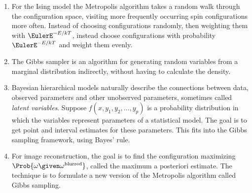 \documentclass[12pt]{article}
\begin{document}
\begin{enumerate}
    \item
        For the Ising model the Metropolis algorithm takes a random walk
        through the configuration space, visiting more frequently
        occurring spin configurations more often.  Instead of choosing
        configurations randomly, then weighting them with \( \EulerE^{-E/kT}
        \), instead choose configurations with probability \( \EulerE^{-E/kT}
        \) and weight them evenly.
    \item
        The Gibbs sampler is an algorithm for generating random
        variables from a marginal distribution indirectly, without
        having to calculate the density.
    \item
        Bayesian hierarchical models naturally describe the connections
        between data, observed parameters and other unobserved
        parameters, sometimes called \emph{latent variables}.  Suppose \(
        f(x, y_1, y_2, \dots, y_p) \) is a probability distribution in
        which the variables represent parameters of a statistical model.
        The goal is to get point and interval estimates for these
        parameters.  This fits into the Gibbs sampling framework, using
        Bayes' rule.
    \item
        For image reconstruction, the goal is to find the configuration
        maximizing \( \Prob{\omega \given \omega^{\text{blurred}}} \),
        called the maximum a posteriori estimate.  The technique is to
        formulate a new version of the Metropolis algorithm called Gibbs
        sampling.
\end{enumerate}

\hr

\end{document}
